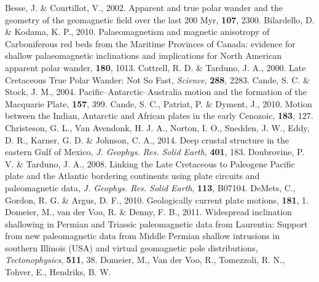 \begin{thebibliography}{}
  Besse, J. \& Courtillot, V., 2002. Apparent and true polar wander and the
  geometry of the geomagnetic field over the last 200 Myr, \jgr{}\textbf{107},
  2300.
  Bilardello, D. \& Kodama, K. P., 2010. Palaeomagnetism and magnetic
  anisotropy of Carboniferous red beds from the Maritime Provinces of Canada:
  evidence for shallow palaeomagnetic inclinations and implications for North
  American apparent polar wander, \gji{}\textbf{180}, 1013.
  Cottrell, R. D. \& Tarduno, J. A., 2000. Late Cretaceous True Polar Wander:
  Not So Fast, \textit{Science}, \textbf{288}, 2283.
  Cande, S. C. \& Stock, J. M., 2004. Pacific–Antarctic–Australia motion and
  the formation of the Macquarie Plate, \gji{}\textbf{157}, 399.
  Cande, S. C., Patriat, P. \& Dyment, J., 2010. Motion between the Indian,
  Antarctic and African plates in the early Cenozoic, \gji{}\textbf{183},
  127.
  Christeson, G. L., Van Avendonk, H. J. A., Norton, I. O., Snedden, J. W.,
  Eddy, D. R., Karner, G. D. \& Johnson, C. A., 2014. Deep crustal structure in
  the eastern Gulf of Mexico, \textit{J. Geophys. Res. Solid Earth},
  \textbf{401}, 183.
  Doubrovine, P. V. \& Tarduno, J. A., 2008. Linking the Late Cretaceous to
  Paleogene Pacific plate and the Atlantic bordering continents using plate
  circuits and paleomagnetic data, \textit{J. Geophys. Res. Solid Earth},
  \textbf{113}, B07104.
  DeMets, C., Gordon, R. G. \& Argus, D. F., 2010. Geologically current plate
  motions, \gji{}\textbf{181}, 1.
  Domeier, M., van der Voo, R. \& Denny, F. B., 2011. Widespread inclination
  shallowing in Permian and Triassic paleomagnetic data from Laurentia: Support
  from new paleomagnetic data from Middle Permian shallow intrusions in
  southern Illinois (USA) and virtual geomagnetic pole distributions,
  \textit{Tectonophysics}, \textbf{511}, 38.
  Domeier, M., Van der Voo, R., Tomezzoli, R. N., Tohver, E., Hendriks, B. W.

\end{thebibliography}

